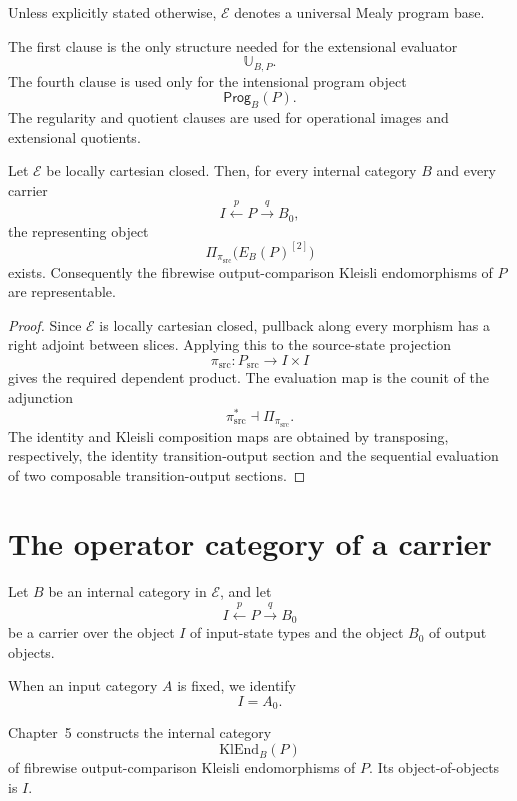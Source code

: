 Unless explicitly stated otherwise, \(\mathcal E\) denotes a universal Mealy program base.

The first clause is the only structure needed for the extensional evaluator
\[
        \mathbb U_{B,P}.
\]
The fourth clause is used only for the intensional program object
\[
        \mathsf{Prog}_B(P).
\]
The regularity and quotient clauses are used for operational images and extensional quotients.

\begin{proposition}
\label{prop:lccc-operator-objects}
Let \(\mathcal E\) be locally cartesian closed.  Then, for every internal category \(B\) and every
carrier
\[
        I\xleftarrow{p}P\xrightarrow{q}B_0,
\]
the representing object
\[
        \Pi_{\pi_{\mathrm{src}}}\bigl(E_B(P)^{[2]}\bigr)
\]
exists.  Consequently the fibrewise output-comparison Kleisli endomorphisms of \(P\) are
representable.
\end{proposition}

\begin{proof}
Since \(\mathcal E\) is locally cartesian closed, pullback along every morphism has a right
adjoint between slices.  Applying this to the source-state projection
\[
        \pi_{\mathrm{src}}:P_{\mathrm{src}}\to I\times I
\]
gives the required dependent product.  The evaluation map is the counit of the adjunction
\[
        \pi_{\mathrm{src}}^{\ast}\dashv \Pi_{\pi_{\mathrm{src}}}.
\]
The identity and Kleisli composition maps are obtained by transposing, respectively, the identity
transition-output section and the sequential evaluation of two composable transition-output
sections.
\end{proof}

\section{The operator category of a carrier}
\label{sec:operator-category-of-a-carrier}

Let \(B\) be an internal category in \(\mathcal E\), and let
\[
        I \xleftarrow{p} P \xrightarrow{q} B_0
\]
be a carrier over the object \(I\) of input-state types and the object \(B_0\) of output objects.

When an input category \(A\) is fixed, we identify
\[
        I=A_0.
\]

Chapter~5 constructs the internal category
\[
        \mathrm{KlEnd}_B(P)
\]
of fibrewise output-comparison Kleisli endomorphisms of \(P\).  Its object-of-objects is \(I\).

